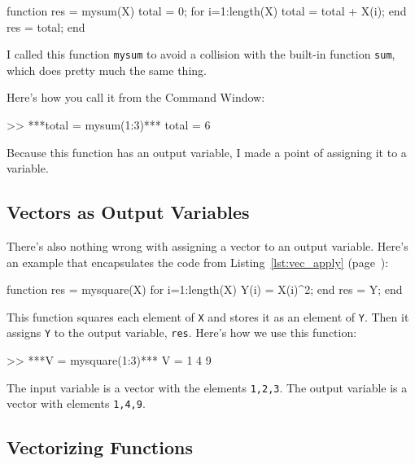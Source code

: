\begin{code}
function res = mysum(X)
    total = 0;
    for i=1:length(X)
        total = total + X(i);
    end
    res = total;
end
\end{code}

I called this function \lstinline{mysum} to avoid a collision with the built-in
function \lstinline{sum}, which does pretty much the same thing.


Here's how you call it from the Command Window:

\begin{code}
>> ***total = mysum(1:3)***
total = 6
\end{code}

Because this function has an output variable, I made a
point of assigning it to a variable.



\subsection{Vectors as Output Variables}

There's also nothing wrong with assigning a vector to an output
variable. Here's an example that encapsulates the code from
Listing~\ref{lst:vec_apply} (page~\pageref{lst:vec_apply}):

\begin{code}
function res = mysquare(X)
    for i=1:length(X)
        Y(i) = X(i)^2;
    end
    res = Y;
end
\end{code}

This function squares each element of \lstinline{X} and stores it as an element of \lstinline{Y}.  Then it assigns \lstinline{Y} to the output variable, \lstinline{res}.  Here's how we use this function:

\begin{code}
>> ***V = mysquare(1:3)***
V = 1     4     9
\end{code}

The input variable is a vector with the elements \lstinline{1,2,3}.  The output variable is a vector with elements \lstinline{1,4,9}.




\subsection{Vectorizing Functions}

